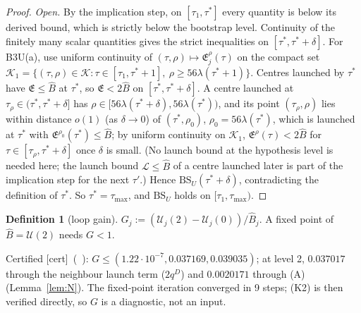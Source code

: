 \documentclass[11pt]{article}
\theoremstyle{definition}\newtheorem{definition}[theorem]{Definition}
\theoremstyle{remark}\newtheorem{remark}[theorem]{Remark}
\newcommand{\key}[1]{\texttt{\detokenize{#1}}}
\newcommand{\tC}{\textup{[cert]}}\newcommand{\tP}{\textup{[paper]}}\newcommand{\tH}{\textup{[hyp]}}\newcommand{\tE}{\textup{[est]}}
\newcommand{\E}{\mathfrak E}\newcommand{\B}{\mathfrak B}\newcommand{\Bh}{\hat B}\newcommand{\Eh}{\hat E^A}
\begin{document}
\begin{proof}
\emph{Open.} By the implication step, on $[\tau_1,\tau^*]$ every quantity is below its derived bound, which is strictly below the bootstrap level. Continuity of the finitely many scalar quantities gives the strict inequalities on $[\tau^*,\tau^*+\delta]$. For B3U(a), use uniform continuity of $(\tau,\rho)\mapsto\E^\rho_j(\tau)$ on the compact set $\mathcal K_1=\{(\tau,\rho)\in\mathcal K:\tau\in[\tau_1,\tau^*+1],\ \rho\ge56\lambda(\tau^*+1)\}$. Centres launched by $\tau^*$ have $\E\le\Bh$ at $\tau^*$, so $\E<2\Bh$ on $[\tau^*,\tau^*+\delta]$. A centre launched at $\tau_\rho\in(\tau^*,\tau^*+\delta]$ has $\rho\in[56\lambda(\tau^*+\delta),56\lambda(\tau^*))$, and its point $(\tau_\rho,\rho)$ lies within distance $o(1)$ (as $\delta\to0$) of $(\tau^*,\rho_0)$, $\rho_0=56\lambda(\tau^*)$, which is launched at $\tau^*$ with $\E^{\rho_0}(\tau^*)\le\Bh$; by uniform continuity on $\mathcal K_1$, $\E^\rho(\tau)<2\Bh$ for $\tau\in[\tau_\rho,\tau^*+\delta]$ once $\delta$ is small. (No launch bound at the hypothesis level is needed here; the launch bound $\mathcal L\le\Bh$ of a centre launched later is part of the implication step for the next $\tau'$.) Hence $\mathrm{BS}_U(\tau^*+\delta)$, contradicting the definition of $\tau^*$. So $\tau^*=\tau_{\max}$, and $\mathrm{BS}_U$ holds on $[\tau_1,\tau_{\max})$.
\end{proof}

\begin{definition}[loop gain]\label{def:gain}
$G_j:=(\mathcal U_j(2)-\mathcal U_j(0))/\Bh_j$. A fixed point of $\Bh=\mathcal U(2)$ needs $G<1$.
\end{definition}
\noindent Certified \tC\ (\SU\ \key{loop_gain}): $G\le(1.22\cdot10^{-7},0.037169,0.039035)$; at level 2, $0.037017$ through the neighbour launch term ($2q^D$) and $0.0020171$ through (A) (Lemma~\ref{lem:N}). The fixed-point iteration converged in 9 steps; (K2) is then verified directly, so $G$ is a diagnostic, not an input.

\end{document}
